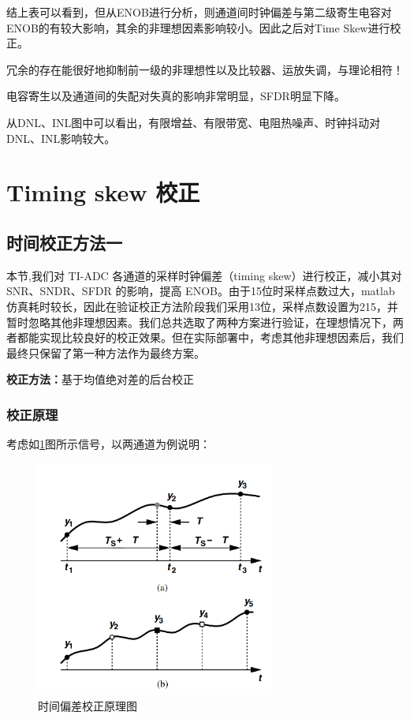 \documentclass[cs4size,a4paper]{ctexart}
\numberwithin{equation}{section}
\numberwithin{table}{section}
\numberwithin{figure}{section}
\begin{document}
		结上表可以看到，但从ENOB进行分析，则通道间时钟偏差与第二级寄生电容对ENOB的有较大影响，其余的非理想因素影响较小。因此之后对Time Skew进行校正。

		冗余的存在能很好地抑制前一级的非理想性以及比较器、运放失调，与理论相符！

		电容寄生以及通道间的失配对失真的影响非常明显，SFDR明显下降。

		从DNL、INL图中可以看出，有限增益、有限带宽、电阻热噪声、时钟抖动对DNL、INL影响较大。
\newpage
		\section{Timing skew 校正}
		\subsection{时间校正方法一}
		\noindent
		本节,我们对 TI-ADC 各通道的采样时钟偏差（timing skew）进行校正，减小其对 SNR、SNDR、SFDR 的影响，提高 ENOB。由于15位时采样点数过大，matlab仿真耗时较长，因此在验证校正方法阶段我们采用13位，采样点数设置为215，并暂时忽略其他非理想因素。我们总共选取了两种方案进行验证，在理想情况下，两者都能实现比较良好的校正效果。但在实际部署中，考虑其他非理想因素后，我们最终只保留了第一种方法作为最终方案。
		
		\noindent
		\textbf{校正方法：}基于均值绝对差的后台校正
		
		\subsubsection{校正原理}
		
		\noindent
		考虑如\ref{fig:ti1}图所示信号，以两通道为例说明：
		\begin{figure}[H]
			\centering
			\includegraphics[width=0.7\textwidth]{figure/ti1.png}
			\caption{时间偏差校正原理图} \label{fig:ti1}
		\end{figure}
		
\end{document}
